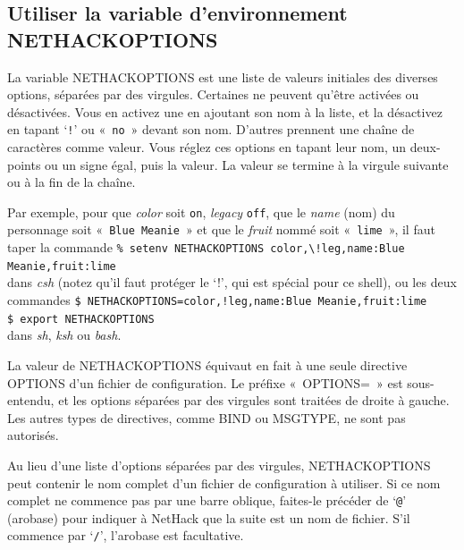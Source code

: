 \documentclass[titlepage]{article}
\begin{document}
\subsection{Utiliser la variable d'environnement NETHACKOPTIONS}



La variable NETHACKOPTIONS est une liste de valeurs initiales des diverses
options, séparées par des virgules.
Certaines ne peuvent qu'être activées ou désactivées.
Vous en activez une en ajoutant son nom à la liste, et la désactivez en
tapant `\texttt{!}' ou «~\texttt{no}~» devant son nom.
D'autres prennent une chaîne de caractères comme valeur.
Vous réglez ces options en tapant leur nom, un deux-points ou un signe
égal, puis la valeur.
La valeur se termine à la virgule suivante ou à la fin de la chaîne.


Par exemple, pour que \textit{color} soit \texttt{on}, \textit{legacy} \texttt{off},
que le \textit{name} (nom) du personnage soit «~\texttt{Blue Meanie}~» et
que le \textit{fruit} nommé soit «~\texttt{lime}~», il faut taper la
commande
\texttt{\% setenv NETHACKOPTIONS \textquotedbl{}color,\textbackslash{}!leg,name:Blue Meanie,fruit:lime\textquotedbl{}}\\
dans \textit{csh} (notez qu'il faut protéger le `!', qui est spécial pour
ce shell), ou les deux commandes
\texttt{\$ NETHACKOPTIONS=\textquotedbl{}color,!leg,name:Blue Meanie,fruit:lime\textquotedbl{}}\\
\texttt{\$ export NETHACKOPTIONS}\\
dans \textit{sh}, \textit{ksh} ou \textit{bash}.


La valeur de NETHACKOPTIONS équivaut en fait à une seule directive OPTIONS
d'un fichier de configuration.
Le préfixe «~OPTIONS=~» est sous-entendu, et les options séparées par
des virgules sont traitées de droite à gauche.
Les autres types de directives, comme BIND ou MSGTYPE, ne sont pas
autorisés.


Au lieu d'une liste d'options séparées par des virgules, NETHACKOPTIONS peut
contenir le nom complet d'un fichier de configuration à utiliser.
Si ce nom complet ne commence pas par une barre oblique, faites-le précéder
de `\texttt{@}' (arobase) pour indiquer à NetHack que la suite est un
nom de fichier.
S'il commence par `\texttt{/}', l'arobase est facultative.
\end{document}
